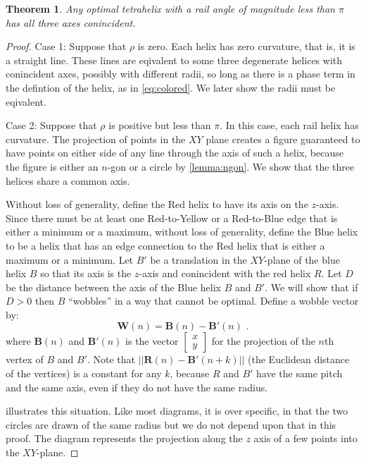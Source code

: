 \documentclass[twocolumn,10pt]{asme2ej}
\newtheorem{theorem}{Theorem}
\renewcommand{\vec}[1]{\mathbf{#1}}
\begin{document}
\begin{theorem}
  Any optimal tetrahelix with a rail angle of magnitude less than $\pi$ has all three
  axes conincident.
  \label{thm:conincident}
\end{theorem}
\begin{proof}
  Case 1: Suppose that $\rho$ is zero.
  Each helix has zero curvature, that is, it is a straight line. These lines are eqivalent
  to some three degenerate helices with conincident axes, possibly with different radii, so long as there is a phase
  term in the defintion of the helix, as in \cref{eq:colored}. We later show the
  radii must be eqivalent.
    
  Case 2: Suppose that $\rho$ is positive but less than $\pi$.
  In this case, each rail helix has
  curvature. The projection of points in the $XY$ plane creates a figure
  guaranteed to have points on either side of any line through the axis of such
  a helix, because the figure is either an $n$-gon or a circle by \cref{lemma:ngon}.
  We show that the three helices share a common axis.

  Without loss of generality, define the Red helix to have its axis on the $z$-axis.
  Since there must be at least one Red-to-Yellow or a Red-to-Blue edge that is either a minimum or a maximum,
  without loss of generality, define the Blue helix to be a helix that
  has an edge connection to the Red helix that is either a maximum or a minimum.
  Let $B'$ be a translation in the $XY$-plane of the blue helix $B$  so that its axis is the $z$-axis and
  conincident with the red helix $R$. Let $D$ be the distance between the axis of the Blue helix
  $B$ and $B'$. We will show that if $D>0$ then $B$ ``wobbles'' in a way that cannot be optimal.
  Define a wobble vector by:
  \begin{equation}
    \vec{W}(n) = \vec{B}(n) - \vec{B}'(n) \text{ .}
  \end{equation}
  where $\vec{B}(n)$ and $\vec{B'}(n)$ is the vector
  $\begin{bmatrix}
    x \\
    y 
  \end{bmatrix}$
  for the projection of the $n$th vertex of $B$ and $B'$. 
  Note that $|| \vec{R}(n) - \vec{B'}(n+k)||$ (the Euclidean distance of the vertices)
  is a constant for any $k$, because $R$ and $B'$ have the
  same pitch and the same axis, even if they do not have the same radius.

   illustrates this situation. Like most diagrams, it is
  over specific, in that the two circles are drawn of the same radius but we do not
  depend upon that in this proof.  The diagram represents the projection along the
  $z$ axis of a few points into the $XY$-plane.


\end{proof}
\end{document}
